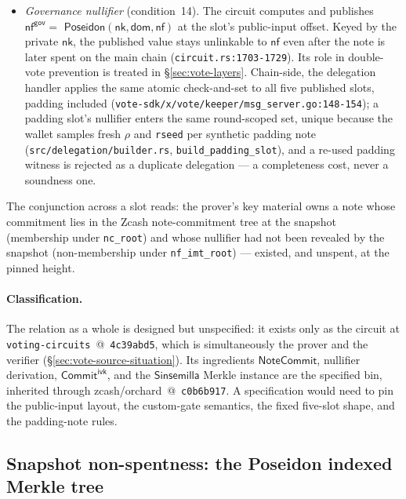 \documentclass[11pt,a4paper]{article}
\theoremstyle{definition}
\newcommand{\nfsym}{\mathsf{nf}}
\newcommand{\NoteCommit}{\ensuremath{\mathsf{NoteCommit}}}
\newcommand{\Sinsemilla}{\ensuremath{\mathsf{Sinsemilla}}}
\newcommand{\CommitIvk}{\ensuremath{\mathsf{Commit}^{\mathsf{ivk}}}}
\newcommand{\nksym}{\ensuremath{\mathsf{nk}}}
\begin{document}
\begin{itemize}
  too, must carry a valid non-membership proof
  (\texttt{README.md} \S13).
\item \emph{Governance nullifier} (condition~14). The circuit computes and
  publishes $\nfsym^{\mathsf{gov}} = {}$
  $\mathsf{Poseidon}(\nksym, \mathsf{dom}, \nfsym)$
  at the slot's public-input offset. Keyed by the private $\nksym$, the
  published value stays unlinkable to $\nfsym$ even after the note is later
  spent on the main chain (\texttt{circuit.rs:1703-1729}). Its role in
  double-vote prevention is treated in \S\ref{sec:vote-layers}. Chain-side,
  the delegation handler applies the same atomic check-and-set to all five
  published slots, padding included
  (\texttt{vote-sdk/x/vote/keeper/msg\_server.go:148-154}); a padding
  slot's nullifier enters the same round-scoped set, unique because the
  wallet samples fresh $\rho$ and \texttt{rseed} per synthetic padding
  note (\texttt{src/delegation/builder.rs}, \texttt{build\_padding\_slot}),
  and a re-used padding witness is rejected as a duplicate delegation ---
  a completeness cost, never a soundness one.
\end{itemize}

The conjunction across a slot reads: the prover's key material owns a note
whose commitment lies in the Zcash note-commitment tree at the snapshot
(membership under \texttt{nc\_root}) and whose nullifier had not been
revealed by the snapshot (non-membership under \texttt{nf\_imt\_root}) ---
existed, and unspent, at the pinned height.

\paragraph{Classification.} The relation as a whole is designed but
unspecified: it exists only as the circuit at
\texttt{voting-circuits}~@~\texttt{4c39abd5}, which is simultaneously the
prover and the verifier (\S\ref{sec:vote-source-situation}). Its
ingredients \NoteCommit{}, nullifier derivation, \CommitIvk{}, and the
\Sinsemilla{} Merkle instance are the specified bin, inherited through
zcash/orchard~@~\texttt{c0b6b917}. A specification would need to pin the
public-input layout, the custom-gate semantics, the fixed five-slot shape,
and the padding-note rules.

\subsection{Snapshot non-spentness: the Poseidon indexed Merkle tree}
\label{sec:vote-imt}
\end{document}
